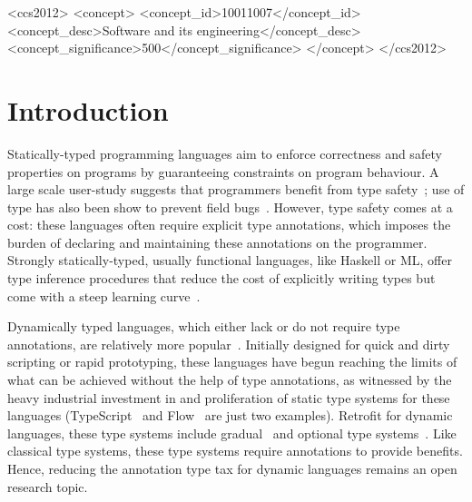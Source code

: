 \documentclass[acmsmall, review, anonymous]{acmart}\settopmatter{printfolios=true,printccs=false,printacmref=false}
\begin{document}
\begin{CCSXML}
<ccs2012>
<concept>
<concept_id>10011007</concept_id>
<concept_desc>Software and its engineering</concept_desc>
<concept_significance>500</concept_significance>
</concept>
</ccs2012>
\end{CCSXML}




 \maketitle
\section{Introduction}
Statically-typed programming languages aim to enforce correctness and safety  properties
on programs by guaranteeing constraints on program behaviour.
A large scale user-study
suggests that programmers
benefit from type safety~\citep{hanenberg14}; use of type has also been
show to prevent field bugs~\citep{gao17}.
However, type safety comes at a cost: these languages often require explicit type annotations,
which imposes the burden of declaring and maintaining these annotations on the programmer.
Strongly statically-typed, usually functional languages, like Haskell or ML,
offer type inference procedures that reduce
the cost of explicitly writing types but come with
a steep learning curve~\citep{tirronen15}.

Dynamically typed languages, which either lack or do not require type
annotations, are relatively more popular~\cite{meyerovich12}.  Initially
designed for quick and dirty scripting or rapid prototyping, these languages
have begun reaching the limits of what can be achieved without the help of type
annotations, as witnessed by the heavy industrial investment in and proliferation of static type systems for these languages (TypeScript~\cite{typescript} and Flow~\cite{flow} are just two
examples).
Retrofit for dynamic languages, these type systems include gradual~\cite{siek06}
and optional type systems~\citep{bracha2004pluggable}.  Like classical type systems, these type systems
require annotations to provide benefits.  Hence, reducing the annotation type tax
for dynamic languages remains an open research topic.
\end{document}
